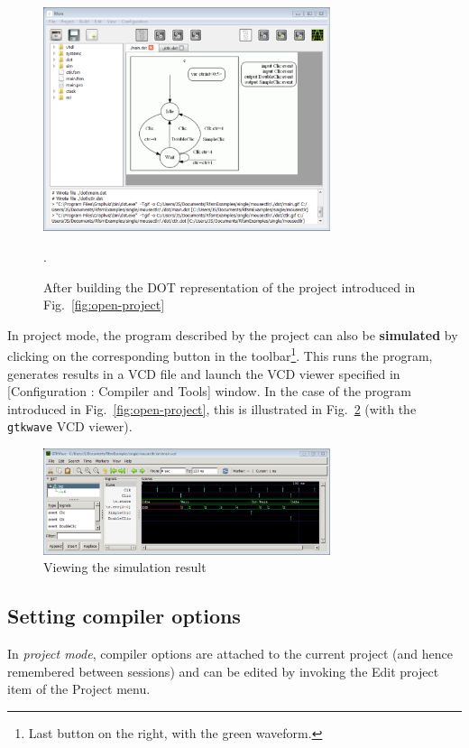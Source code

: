 \begin{figure}[h]
  \centering
  \includegraphics[width=0.75\textwidth]{figs/gui/make-dot-project}
  \caption{After building the DOT representation of the project introduced in
    Fig.~\ref{fig:open-project}}.
  \label{fig:make-dot-project}
\end{figure}


\medskip
In project mode, the program described by the project can also be \textbf{simulated} by clicking on
the corresponding button in the toolbar\footnote{Last button on the right, with the green
  waveform.}. This runs the program, generates results in a VCD file and launch the VCD viewer specified in 
  [\textsf{Configuration : Compiler and Tools}] window. In the case of the program introduced in
  Fig.~\ref{fig:open-project}, this is illustrated in Fig.~\ref{fig:make-sim} (with the
  \verb|gtkwave| VCD viewer).

\begin{figure}[h]
  \centering
  \includegraphics[width=0.75\textwidth]{figs/gui/make-sim}
  \caption{Viewing the simulation result}
  \label{fig:make-sim}
\end{figure}

\subsection{Setting compiler options}
\label{sec:gui-project-options}

In \emph{project mode}, compiler options are attached to the current project (and hence remembered
between sessions) and can be edited by invoking the \textsf{Edit project} item of the \textsf{Project}
menu.


